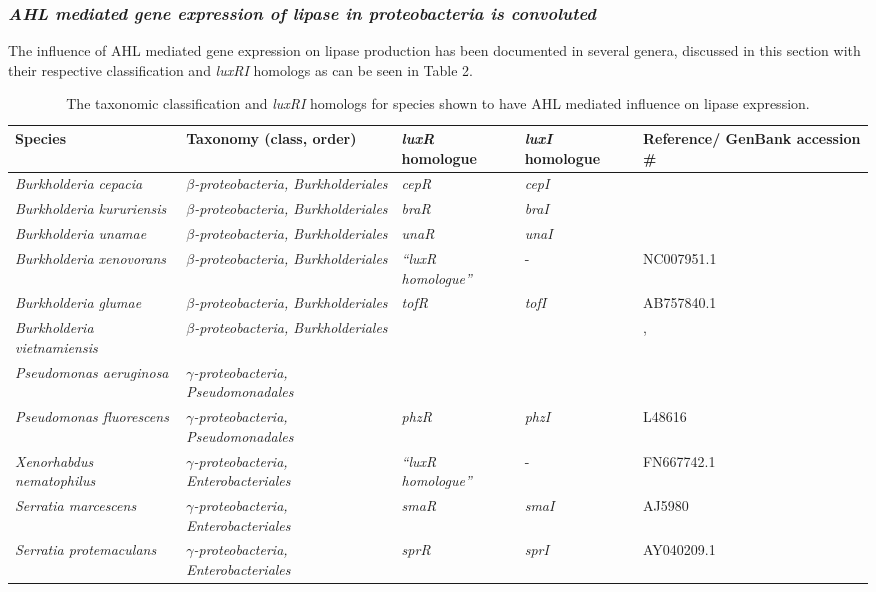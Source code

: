 \documentclass{article}
\begin{document}
\subsubsection{\emph{AHL mediated gene expression of lipase in proteobacteria is convoluted}}
The influence of AHL mediated gene expression on lipase production has been documented in several genera, discussed in this section with their respective classification and \emph{luxRI} homologs as can be seen in Table 2.

\begin{table}
\begin{tabular}{ | p{2.5cm} | p{3cm} | p{1.5cm} | p{1.5cm} | p{2.5cm} | }
\hline
Species & Taxonomy (class, order) & \emph{luxR} homologue & \emph{luxI} homologue & Reference/ GenBank accession \# \\
\hline
\emph{Burkholderia cepacia} & \emph{$\beta$-proteobacteria, Burkholderiales} & \emph{cepR} & \emph{cepI} & \cite{lewenza1999} \\
\hline
\emph{Burkholderia kururiensis} & \emph{$\beta$-proteobacteria, Burkholderiales} & \emph{braR} & \emph{braI} & \cite{suarez2008} \\
\hline
\emph{Burkholderia unamae} & \emph{$\beta$-proteobacteria, Burkholderiales} & \emph{unaR} & \emph{unaI} & \cite{suarez2010} \\
\hline
\emph{Burkholderia xenovorans} & \emph{$\beta$-proteobacteria, Burkholderiales} & \emph{“luxR homologue”} & - & NC007951.1 \\
\hline
\emph{Burkholderia glumae} & \emph{$\beta$-proteobacteria, Burkholderiales} & \emph{tofR} & \emph{tofI} & AB757840.1 \\
\hline
\emph{Burkholderia vietnamiensis} & \emph{$\beta$-proteobacteria, Burkholderiales} & \emph{} & \emph{} & \cite{conway_02}, \cite{ulrich2004}
 \\
\hline
\emph{Pseudomonas aeruginosa} & \emph{$\gamma$-proteobacteria, Pseudomonadales} & \emph{} & \emph{} & \cite{juhas2005} \\
\hline
\emph{Pseudomonas fluorescens} & \emph{$\gamma$-proteobacteria, Pseudomonadales} & \emph{phzR} & \emph{phzI} & L48616 \\
\hline
\emph{Xenorhabdus nematophilus} & \emph{$\gamma$-proteobacteria, Enterobacteriales} & \emph{“luxR homologue”} & - & FN667742.1 \\
\hline
\emph{Serratia marcescens} & \emph{$\gamma$-proteobacteria, Enterobacteriales} & \emph{smaR} & \emph{smaI} & AJ5980 \\
\hline
\emph{Serratia protemaculans} & \emph{$\gamma$-proteobacteria, Enterobacteriales} & \emph{sprR} & \emph{sprI} & AY040209.1 \\
\hline
\end{tabular}
\caption{The taxonomic classification and \emph{luxRI} homologs for species shown to have AHL mediated influence on lipase expression.}
\end{table}
\end{document}
